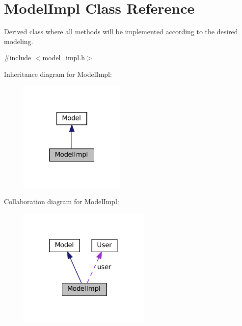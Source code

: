 \hypertarget{classModelImpl}{}\section{Model\+Impl Class Reference}
\label{classModelImpl}


Derived class where all methods will be implemented according to the desired modeling.  




{\ttfamily \#include $<$model\+\_\+impl.\+h$>$}



Inheritance diagram for Model\+Impl\+:\nopagebreak
\begin{figure}[H]
\begin{center}
\leavevmode
\includegraphics[width=148pt]{classModelImpl__inherit__graph}
\end{center}
\end{figure}


Collaboration diagram for Model\+Impl\+:\nopagebreak
\begin{figure}[H]
\begin{center}
\leavevmode
\includegraphics[width=184pt]{classModelImpl__coll__graph}
\end{center}
\end{figure}
